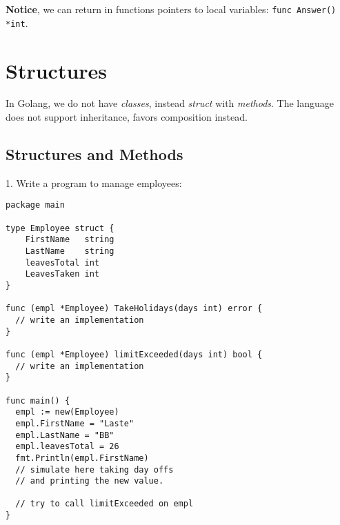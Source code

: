 \documentclass[11pt, letterpaper]{article}
\begin{document}
\textbf{Notice}, we can return in functions pointers to local variables: \texttt{func Answer() *int}.

\section{Structures}

In Golang, we do not have \emph{classes}, instead \emph{struct} with \emph{methods}. The language does not support inheritance, favors composition instead.

\subsection{Structures and Methods}

1. Write a program to manage employees:

\begin{verbatim}
package main

type Employee struct {
    FirstName   string
    LastName    string
    leavesTotal int
    LeavesTaken int
}

func (empl *Employee) TakeHolidays(days int) error {
  // write an implementation
}

func (empl *Employee) limitExceeded(days int) bool {
  // write an implementation
}

func main() {
  empl := new(Employee)
  empl.FirstName = "Laste"
  empl.LastName = "BB"
  empl.leavesTotal = 26
  fmt.Println(empl.FirstName)
  // simulate here taking day offs
  // and printing the new value.

  // try to call limitExceeded on empl
}
\end{verbatim}

\bigskip






\end{document}
